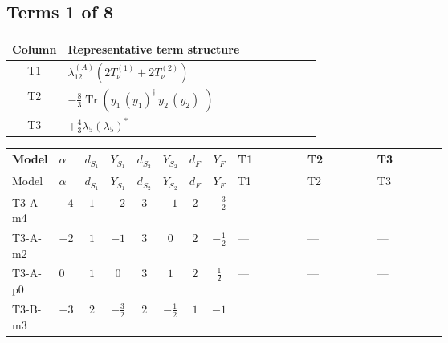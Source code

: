 \documentclass[8pt]{article}
\begin{document}
\begin{landscape}
\subsection*{Terms 1 of 8}
\begin{center}
\begin{tabular}{@{}c >{\raggedright\arraybackslash}p{0.82\linewidth}@{}}
\toprule
Column & Representative term structure \\
\midrule
T1 & \(\displaystyle {\lambda_{12}^{(A)}} (2 T_{\nu}^{(1)}+2 T_{\nu}^{(2)})\) \\
\midrule
T2 & \(\displaystyle -\frac{8}{3} \operatorname{Tr}\!\left({y_1}\,\left({y_1}\right)^{\dagger}\,{y_2}\,\left({y_2}\right)^{\dagger}\right)\) \\
\midrule
T3 & \(\displaystyle +\frac{4}{3} {\lambda_5} \left({\lambda_5}\right)^{*}\) \\
\midrule
\bottomrule
\end{tabular}
\end{center}
\smallskip
\tiny
\begin{longtable}{@{}llcccccc >{\raggedright\arraybackslash}p{0.21\linewidth} >{\raggedright\arraybackslash}p{0.21\linewidth} >{\raggedright\arraybackslash}p{0.21\linewidth}@{}}
\toprule
Model & $\alpha$ & $d_{S_1}$ & $Y_{S_1}$ & $d_{S_2}$ & $Y_{S_2}$ & $d_F$ & $Y_F$ & T1 & T2 & T3 \\
\midrule
\endfirsthead
\toprule
Model & $\alpha$ & $d_{S_1}$ & $Y_{S_1}$ & $d_{S_2}$ & $Y_{S_2}$ & $d_F$ & $Y_F$ & T1 & T2 & T3 \\
\midrule
\endhead
T3-A-m4 & $-4$ & $1$ & $-2$ & $3$ & $-1$ & $2$ & $-\frac{3}{2}$ & --- & --- & --- \\
\midrule
T3-A-m2 & $-2$ & $1$ & $-1$ & $3$ & $0$ & $2$ & $-\frac{1}{2}$ & --- & --- & --- \\
\midrule
T3-A-p0 & $0$ & $1$ & $0$ & $3$ & $1$ & $2$ & $\frac{1}{2}$ & --- & --- & --- \\
\midrule
T3-B-m3 & $-3$ & $2$ & $-\frac{3}{2}$ & $2$ & $-\frac{1}{2}$ & $1$ & $-1$ & \scriptsize\adjustbox{max width=\linewidth}{$\begin{gathered} {\lambda_{12}^{(A)}} (2 T_{\nu}^{(1)}+2 T_{\nu}^{(2)})\end{gathered}$} & \scriptsize\adjustbox{max width=\linewidth}{$\begin{gathered} -\frac{8}{3} \operatorname{Tr}\!\left({y_1}\,\left({y_1}\right)^{\dagger}\,{y_2}\,\left({y_2}\right)^{\dagger}\right)\end{gathered}$} & \scriptsize\adjustbox{max width=\linewidth}{$\begin{gathered} +\frac{4}{3} {\lambda_5} \left({\lambda_5}\right)^{*}\end{gathered}$} \\

\end{longtable}
\end{landscape}
\end{document}
